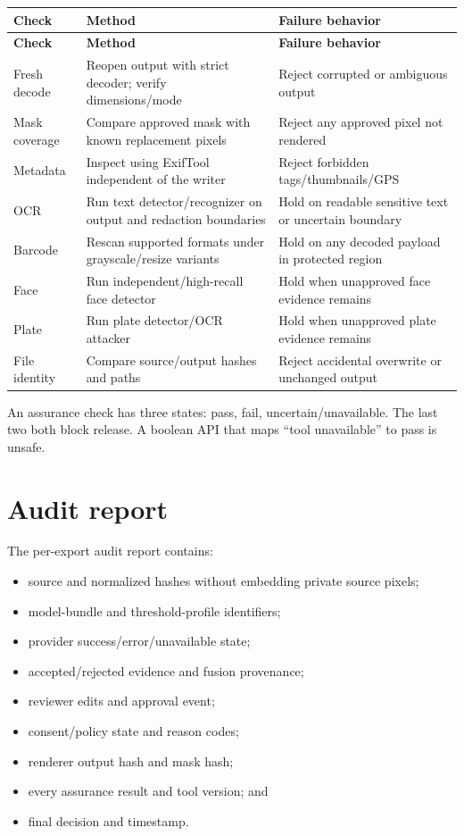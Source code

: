\begin{longtable}{@{}L{33mm}L{55mm}L{57mm}@{}}
\toprule
\textbf{Check} & \textbf{Method} & \textbf{Failure behavior} \\
\midrule
\endfirsthead
\toprule
\textbf{Check} & \textbf{Method} & \textbf{Failure behavior} \\
\midrule
\endhead
Fresh decode & Reopen output with strict decoder; verify dimensions/mode & Reject corrupted or ambiguous output \\
Mask coverage & Compare approved mask with known replacement pixels & Reject any approved pixel not rendered \\
Metadata & Inspect using ExifTool independent of the writer & Reject forbidden tags/thumbnails/GPS \\
OCR & Run text detector/recognizer on output and redaction boundaries & Hold on readable sensitive text or uncertain boundary \\
Barcode & Rescan supported formats under grayscale/resize variants & Hold on any decoded payload in protected region \\
Face & Run independent/high-recall face detector & Hold when unapproved face evidence remains \\
Plate & Run plate detector/OCR attacker & Hold when unapproved plate evidence remains \\
File identity & Compare source/output hashes and paths & Reject accidental overwrite or unchanged output \\
\bottomrule
\end{longtable}

An assurance check has three states: pass, fail, uncertain/unavailable. The last two both block release. A boolean API that maps ``tool unavailable'' to pass is unsafe.

\section{Audit report}

The per-export audit report contains:

\begin{itemize}[leftmargin=6mm]
  \item source and normalized hashes without embedding private source pixels;
  \item model-bundle and threshold-profile identifiers;
  \item provider success/error/unavailable state;
  \item accepted/rejected evidence and fusion provenance;
  \item reviewer edits and approval event;
  \item consent/policy state and reason codes;
  \item renderer output hash and mask hash;
  \item every assurance result and tool version; and
  \item final decision and timestamp.
\end{itemize}

